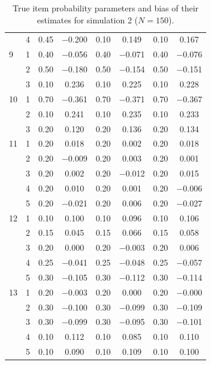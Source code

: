 \begin{table}[H]
\begin{tabular}{llcccccc}
   & 4 & 0.45 & $-$0.200 & 0.10 & 0.149 & 0.10 & 0.167 \\ 
  9 & 1 & 0.40 & $-$0.056 & 0.40 & $-$0.071 & 0.40 & $-$0.076 \\ 
   & 2 & 0.50 & $-$0.180 & 0.50 & $-$0.154 & 0.50 & $-$0.151 \\ 
   & 3 & 0.10 & 0.236 & 0.10 & 0.225 & 0.10 & 0.228 \\ 
  10 & 1 & 0.70 & $-$0.361 & 0.70 & $-$0.371 & 0.70 & $-$0.367 \\ 
   & 2 & 0.10 & 0.241 & 0.10 & 0.235 & 0.10 & 0.233 \\ 
   & 3 & 0.20 & 0.120 & 0.20 & 0.136 & 0.20 & 0.134 \\ 
  11 & 1 & 0.20 & 0.018 & 0.20 & 0.002 & 0.20 & 0.018 \\ 
   & 2 & 0.20 & $-$0.009 & 0.20 & 0.003 & 0.20 & 0.001 \\ 
   & 3 & 0.20 & 0.002 & 0.20 & $-$0.012 & 0.20 & 0.015 \\ 
   & 4 & 0.20 & 0.010 & 0.20 & 0.001 & 0.20 & $-$0.006 \\ 
   & 5 & 0.20 & $-$0.021 & 0.20 & 0.006 & 0.20 & $-$0.027 \\ 
  12 & 1 & 0.10 & 0.100 & 0.10 & 0.096 & 0.10 & 0.106 \\ 
   & 2 & 0.15 & 0.045 & 0.15 & 0.066 & 0.15 & 0.058 \\ 
   & 3 & 0.20 & 0.000 & 0.20 & $-$0.003 & 0.20 & 0.006 \\ 
   & 4 & 0.25 & $-$0.041 & 0.25 & $-$0.048 & 0.25 & $-$0.057 \\ 
   & 5 & 0.30 & $-$0.105 & 0.30 & $-$0.112 & 0.30 & $-$0.114 \\ 
  13 & 1 & 0.20 & $-$0.003 & 0.20 & 0.000 & 0.20 & $-$0.000 \\ 
   & 2 & 0.30 & $-$0.100 & 0.30 & $-$0.099 & 0.30 & $-$0.109 \\ 
   & 3 & 0.30 & $-$0.099 & 0.30 & $-$0.095 & 0.30 & $-$0.101 \\ 
   & 4 & 0.10 & 0.112 & 0.10 & 0.085 & 0.10 & 0.110 \\ 
   & 5 & 0.10 & 0.090 & 0.10 & 0.109 & 0.10 & 0.100 \\ 
   \bottomrule
\end{tabular}
\caption{True item probability parameters and bias of their estimates for simulation 2 ($N = 150$).} 
\label{table:sim2_item_prob_bias_N150}
\end{table}
